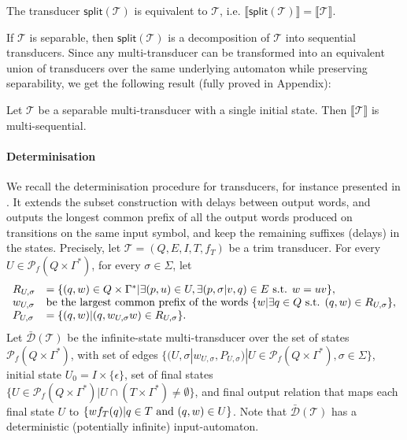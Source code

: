 \documentclass[envcountsame]{llncs}
\newcommand\inter[1]{\llbracket #1 \rrbracket}
\newcommand\tra{\mathcal{T}}
\begin{document}
\begin{lemma}\label{split_eq}
The transducer $\textsf{split}(\tra)$ is equivalent to $\tra$,
i.e. $\inter{\textsf{split}(\tra)}=\inter{\tra}$. 
\end{lemma}



If $\tra$ is separable, then $\textsf{split}(\tra)$ is a decomposition
of $\tra$ into sequential transducers. Since any multi-transducer can
be transformed into an equivalent union of transducers over the same
underlying automaton while preserving separability, we get the
following result (fully proved in Appendix):


\begin{lemma}\label{sepmultiseq}
Let $\tra$ be a separable multi-transducer with a single initial state.
Then $\inter{\tra}$ is multi-sequential. 
\end{lemma}

\paragraph{\textbf{Determinisation}} We recall the determinisation
procedure for transducers, for instance presented in 
\cite{DBLP:journals/tcs/BealC02}. It extends the subset construction
with delays between output words, and outputs the longest common
prefix of all the output words produced on transitions on the same input
symbol, and keep the remaining suffixes (delays) in the states. 
Precisely, let $\tra = (Q,E,I,T,f_T)$ be a trim transducer. For every $U \in \mathcal{P}_f(Q \times \Gamma^*)$, for every $\sigma \in \Sigma$, let 
$$\begin{array}{ll}
R_{U,\sigma} & = \{(q,w) \in Q \times \Gamma^* | \exists (p,u) \in U, \exists (p,\sigma|v,q) \in E \textup{ s.t. } w = uv\},\\
w_{U,\sigma} & \textup{be the largest common prefix of the words $\{ w | \exists q \in Q \textup{ s.t. } (q,w) \in R_{U,\sigma}$} \} ,\\
P_{U,\sigma} & = \{(q,w) | (q,w_{U,\sigma}w) \in R_{U,\sigma} \}.
\end{array}$$
Let $\bar{\mathcal{D}}(\tra)$ be the infinite-state multi-transducer
over the set of states $\mathcal{P}_f(Q \times \Gamma^*)$, with set of
edges $\{ (U,\sigma|w_{U,\sigma},P_{U,\sigma}) | U \in \mathcal{P}_f(Q
\times \Gamma^*), \sigma \in \Sigma \}$,  initial state $U_0 = I\times
\{\epsilon\}$, set of final states $\{ U \in \mathcal{P}_f(Q \times \Gamma^*) | U \cap (T \times \Gamma^*) \neq \emptyset \}$, and final output relation that maps each final state $U$ to $\{wf_T(q) | q \in T \textup{ and } (q,w) \in U \}$.
Note that $\bar{\mathcal{D}}(\tra)$ has a deterministic (potentially
infinite) input-automaton.
\end{document}
